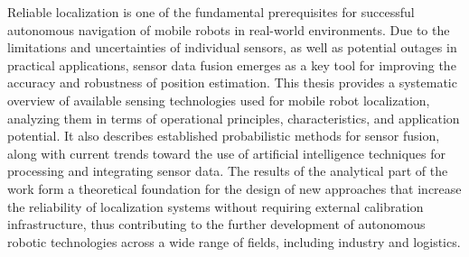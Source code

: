 Reliable localization is one of the fundamental prerequisites for successful autonomous navigation of mobile robots in real-world environments. Due to the limitations and uncertainties of individual sensors, as well as potential outages in practical applications, sensor data fusion emerges as a key tool for improving the accuracy and robustness of position estimation. This thesis provides a systematic overview of available sensing technologies used for mobile robot localization, analyzing them in terms of operational principles, characteristics, and application potential. It also describes established probabilistic methods for sensor fusion, along with current trends toward the use of artificial intelligence techniques for processing and integrating sensor data. The results of the analytical part of the work form a theoretical foundation for the design of new approaches that increase the reliability of localization systems without requiring external calibration infrastructure, thus contributing to the further development of autonomous robotic technologies across a wide range of fields, including industry and logistics.